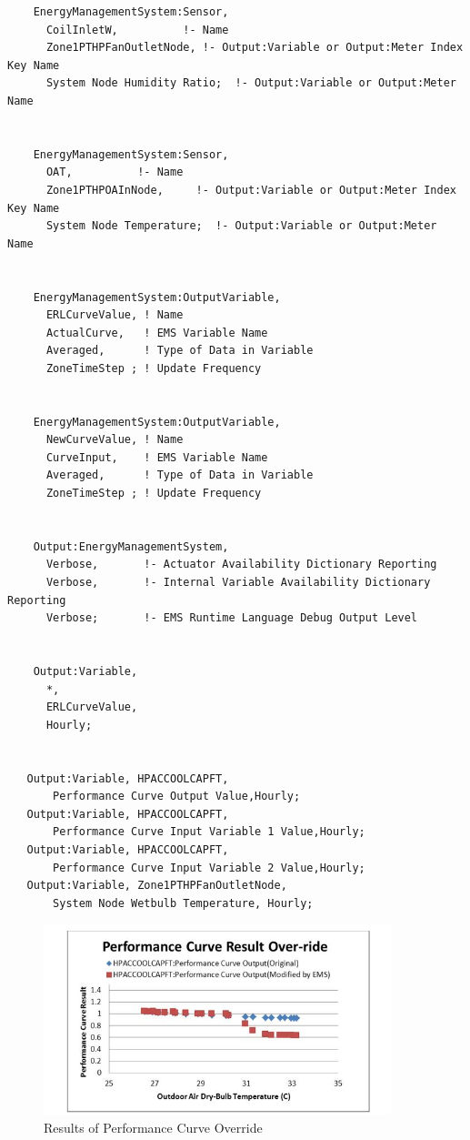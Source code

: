 \begin{lstlisting}
    EnergyManagementSystem:Sensor,
      CoilInletW,          !- Name
      Zone1PTHPFanOutletNode, !- Output:Variable or Output:Meter Index Key Name
      System Node Humidity Ratio;  !- Output:Variable or Output:Meter Name


    EnergyManagementSystem:Sensor,
      OAT,          !- Name
      Zone1PTHPOAInNode,     !- Output:Variable or Output:Meter Index Key Name
      System Node Temperature;  !- Output:Variable or Output:Meter Name


    EnergyManagementSystem:OutputVariable,
      ERLCurveValue, ! Name
      ActualCurve,   ! EMS Variable Name
      Averaged,      ! Type of Data in Variable
      ZoneTimeStep ; ! Update Frequency


    EnergyManagementSystem:OutputVariable,
      NewCurveValue, ! Name
      CurveInput,    ! EMS Variable Name
      Averaged,      ! Type of Data in Variable
      ZoneTimeStep ; ! Update Frequency


    Output:EnergyManagementSystem,
      Verbose,       !- Actuator Availability Dictionary Reporting
      Verbose,       !- Internal Variable Availability Dictionary Reporting
      Verbose;       !- EMS Runtime Language Debug Output Level


    Output:Variable,
      *,
      ERLCurveValue,
      Hourly;


   Output:Variable, HPACCOOLCAPFT,
       Performance Curve Output Value,Hourly;
   Output:Variable, HPACCOOLCAPFT,
       Performance Curve Input Variable 1 Value,Hourly;
   Output:Variable, HPACCOOLCAPFT,
       Performance Curve Input Variable 2 Value,Hourly;
   Output:Variable, Zone1PTHPFanOutletNode,
       System Node Wetbulb Temperature, Hourly;
\end{lstlisting}

\begin{figure}[hbtp] %
\centering
\includegraphics[width=0.9\textwidth, height=0.9\textheight, keepaspectratio=true]{media/image011.jpg}
\caption{Results of Performance Curve Override \protect \label{fig:results-of-performance-curve-override}}
\end{figure}
